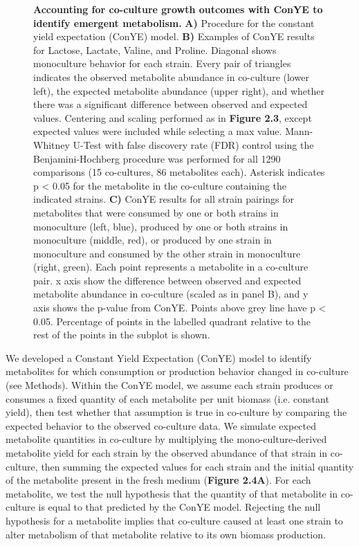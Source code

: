 \documentclass[11pt,twocolumn,notitlepage,openany,twoside]{book}
\begin{document}
\begin{refsection}
\begin{figure}[tb!]
\caption[Accounting for co-culture growth outcomes with ConYE to identify emergent metabolism.]{\textbf{Accounting for co-culture growth outcomes with ConYE to identify emergent metabolism.} \textbf{A)} Procedure for the constant yield expectation (ConYE) model. \textbf{B)} Examples of ConYE results for Lactose, Lactate, Valine, and Proline. Diagonal shows monoculture behavior for each strain. Every pair of triangles indicates the observed metabolite abundance in co-culture (lower left), the expected metabolite abundance (upper right), and whether there was a significant difference between observed and expected values. Centering and scaling performed as in \textbf{Figure 2.3}, except expected values were included while selecting a max value. Mann-Whitney U-Test with false discovery rate (FDR) control using the Benjamini-Hochberg procedure was performed for all 1290 comparisons (15 co-cultures, 86 metabolites each). Asterisk indicates p < 0.05 for the metabolite in the co-culture containing the indicated strains. \textbf{C)} ConYE results for all strain pairings for metabolites that were consumed by one or both strains in monoculture (left, blue), produced by one or both strains in monoculture (middle, red), or produced by one strain in monoculture and consumed by the other strain in monoculture (right, green). Each point represents a metabolite in a co-culture pair. x axis show the difference between observed and expected metabolite abundance in co-culture (scaled as in panel B), and y axis shows the p-value from ConYE. Points above grey line have p < 0.05. Percentage of points in the labelled quadrant relative to the rest of the points in the subplot is shown.}
\end{figure}

We developed a Constant Yield Expectation (ConYE) model to identify metabolites for which consumption or production behavior changed in co-culture (see Methods). Within the ConYE model, we assume each strain produces or consumes a fixed quantity of each metabolite per unit biomass (i.e. constant yield), then test whether that assumption is true in co-culture by comparing the expected behavior to the observed co-culture data. We simulate expected metabolite quantities in co-culture by multiplying the mono-culture-derived metabolite yield for each strain by the observed abundance of that strain in co-culture, then summing the expected values for each strain and the initial quantity of the metabolite present in the fresh medium (\textbf{Figure 2.4A}). For each metabolite, we test the null hypothesis that the quantity of that metabolite in co-culture is equal to that predicted by the ConYE model. Rejecting the null hypothesis for a metabolite implies that co-culture caused at least one strain to alter metabolism of that metabolite relative to its own biomass production.


\end{refsection}
\end{document}
